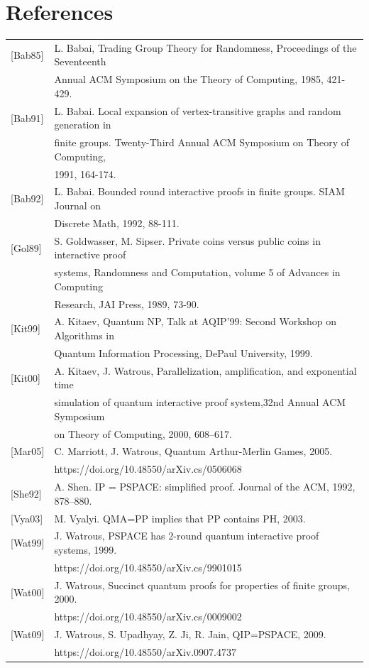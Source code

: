 \documentclass[12pt]{article}
\numberwithin{thm}{section}
\numberwithin{defn}{section}
\numberwithin{prop}{section}
\numberwithin{rmk}{section}
\begin{document}
	\section*{References}
	\begin{tabular}{ l l }
		\label{bab}[Bab85] & L. Babai, Trading Group Theory for Randomness, Proceedings of the Seventeenth\\& Annual ACM
		Symposium on the Theory of Computing, 1985, 421-429.\\
		\label{bab91}[Bab91] & L. Babai. Local expansion of vertex-transitive graphs and random generation in\\ & finite groups. Twenty-Third Annual ACM Symposium on Theory of Computing,\\& 1991, 164-174.\\
		\label{bab92}[Bab92] & L. Babai. Bounded round interactive proofs in finite groups. SIAM Journal on\\& Discrete Math, 1992, 88-111.\\
		\label{gol89}[Gol89] & S. Goldwasser, M. Sipser. Private coins versus public coins in interactive proof \\& systems, Randomness and Computation, volume 5 of Advances in Computing\\& Research, JAI Press, 1989, 73-90.\\
		\label{kit99}[Kit99] & A. Kitaev, Quantum NP, Talk at AQIP’99: Second Workshop on Algorithms in\\& Quantum
		Information Processing, DePaul University, 1999.\\
		\label{kit00}[Kit00] & A. Kitaev, J. Watrous, Parallelization, amplification, and exponential time\\& simulation of quantum interactive proof system,32nd Annual ACM Symposium\\& on Theory of Computing, 2000, 608–617.\\
		\label{mar05}[Mar05] & C. Marriott, J. Watrous, Quantum Arthur-Merlin Games, 2005. \\&https://doi.org/10.48550/arXiv.cs/0506068\\
		\label{she92}[She92] & A. Shen. IP = PSPACE: simplified proof. Journal of the ACM, 1992, 878–880.\\
		\label{vya03}[Vya03] & M. Vyalyi. QMA=PP implies that PP contains PH, 2003.\\
		\label{wat99}[Wat99] & J. Watrous, PSPACE has 2-round quantum interactive proof systems, 1999. \\&https://doi.org/10.48550/arXiv.cs/9901015\\
		\label{wat00}[Wat00] & J. Watrous, Succinct quantum proofs for properties of finite groups, 2000. \\&https://doi.org/10.48550/arXiv.cs/0009002\\
		\label{wat09}[Wat09] & J. Watrous, S. Upadhyay, Z. Ji, R. Jain, QIP=PSPACE, 2009.
		\\&https://doi.org/10.48550/arXiv.0907.4737
		
	\end{tabular}
	
		
\end{document}
